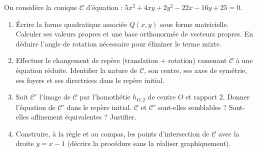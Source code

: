 \documentclass[11pt]{article}
\begin{document}
\begin{exercice}
On considère la conique $\mathcal{C}$ d'équation : $5x^2 + 4xy + 2y^2 - 22x - 16y + 25 = 0$.
\begin{enumerate}
    \item Écrire la forme quadratique associée $Q(x,y)$ sous forme matricielle. Calculer ses valeurs propres et une base orthonormée de vecteurs propres. En déduire l'angle de rotation nécessaire pour éliminer le terme mixte.
    \item Effectuer le changement de repère (translation + rotation) ramenant $\mathcal{C}$ à une équation réduite. Identifier la nature de $\mathcal{C}$, son centre, ses axes de symétrie, ses foyers et ses directrices dans le repère initial.
    \item Soit $\mathcal{C}'$ l'image de $\mathcal{C}$ par l'homothétie $h_{O,2}$ de centre $O$ et rapport $2$. Donner l'équation de $\mathcal{C}'$ dans le repère initial. $\mathcal{C}$ et $\mathcal{C}'$ sont-elles semblables ? Sont-elles affinement équivalentes ? Justifier.
    \item Construire, à la règle et au compas, les points d'intersection de $\mathcal{C}$ avec la droite $y = x - 1$ (décrire la procédure sans la réaliser graphiquement).
\end{enumerate}
\end{exercice}
\end{document}
